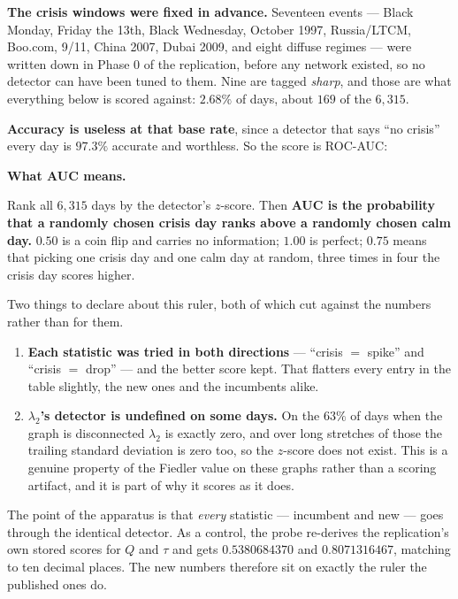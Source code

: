 \documentclass[11pt,a4paper]{article}
\newcommand{\Q}{Q}
\newenvironment{aside}[1]
 {\par\vspace{2.5mm}\begin{lrbox}{\asidebox}%
  \begin{minipage}{\dimexpr\textwidth-16pt\relax}\small\textbf{#1}\par\vspace{1mm}}
 {\end{minipage}\end{lrbox}%
  \noindent\setlength{\fboxsep}{7pt}\setlength{\fboxrule}{.4pt}%
  \fcolorbox{Rule}{Panel2}{\usebox{\asidebox}}\par\vspace{2.5mm}}
\begin{document}
\textbf{The crisis windows were fixed in advance.} Seventeen events --- Black
Monday, Friday the 13th, Black Wednesday, October 1997, Russia/LTCM, Boo.com,
9/11, China 2007, Dubai 2009, and eight diffuse regimes --- were written down in
Phase 0 of the replication, before any network existed, so no detector can have
been tuned to them. Nine are tagged \emph{sharp}, and those are what everything
below is scored against: $2.68\%$ of days, about $169$ of the $6{,}315$.

\textbf{Accuracy is useless at that base rate}, since a detector that says ``no
crisis'' every day is $97.3\%$ accurate and worthless. So the score is ROC-AUC:

\begin{aside}{What AUC means.}
Rank all $6{,}315$ days by the detector's $z$-score. Then
\textbf{AUC is the probability that a randomly chosen crisis day ranks above a
randomly chosen calm day.} $0.50$ is a coin flip and carries no information;
$1.00$ is perfect; $0.75$ means that picking one crisis day and one calm day at
random, three times in four the crisis day scores higher.
\end{aside}

\noindent Two things to declare about this ruler, both of which cut against the
numbers rather than for them.

\begin{enumerate}
\item \textbf{Each statistic was tried in both directions} --- ``crisis $=$
spike'' and ``crisis $=$ drop'' --- and the better score kept. That flatters
every entry in the table slightly, the new ones and the incumbents alike.
\item \textbf{$\lambda_2$'s detector is undefined on some days.} On the $63\%$
of days when the graph is disconnected $\lambda_2$ is exactly zero, and over
long stretches of those the trailing standard deviation is zero too, so the
$z$-score does not exist. This is a genuine property of the Fiedler value on
these graphs rather than a scoring artifact, and it is part of why it scores as
it does.
\end{enumerate}

The point of the apparatus is that \emph{every} statistic --- incumbent and new
--- goes through the identical detector. As a control, the probe re-derives the
replication's own stored scores for $\Q$ and $\tau$ and gets
$0.5380684370$ and $0.8071316467$, matching to ten decimal places. The new
numbers therefore sit on exactly the ruler the published ones do.
\end{document}
